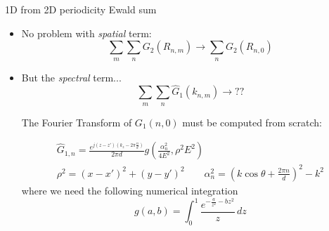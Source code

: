 \begin{frame}[allowframebreaks]{1D from 2D periodicity Ewald sum}

  \begin{itemize}
    \item No problem with \emph{spatial} term:
      \[
        \sum_m\sum_n G_2(R_{n,m}) \rightarrow \sum_{n} G_2(R_{n,0})
      \]
    \item But the \emph{spectral} term...
      \[
        \sum_m\sum_n \hat{G}_1(k_{n,m}) \rightarrow ??
      \]

      The Fourier Transform of $G_1(n,0)$ must be computed from scratch:

      \begin{gather*}
        \hat{G}_{1,n} =
        \frac{e^{j(z-z')(k_z - 2\pi \frac{n}{d})}}{2 \pi d} 
        g\left(\frac{\alpha_n^2}{4 E^2}, \rho^2 E^2\right)
        \\
         \rho^2 = (x-x')^2 + (y-y')^2
         \qquad
         \alpha_n^2 = \left(k\cos\theta + \frac{2 \pi n}{d}\right)^2 - k^2
      \end{gather*}
      where we need the following numerical integration
      \[
        g(a,b) = \int_0^1 \frac{
          e^{-\frac{a}{z^2}-b z^2}
        }{z}
        \, dz
      \]
  \end{itemize}

\end{frame}


